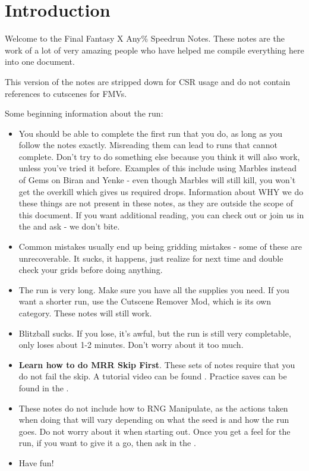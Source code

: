 \chapter{Introduction}

Welcome to the Final Fantasy X Any\% Speedrun Notes. These notes are the work of a lot of very amazing people who have helped me compile everything here into one document.

This version of the notes are stripped down for CSR usage and do not contain references to cutscenes for FMVs.

Some beginning information about the run:

\begin{itemize}
    \item You should be able to complete the first run that you do, as long as you follow the notes exactly. Misreading them can lead to runs that cannot complete. Don't try to do something else because you think it will also work, unless you've tried it before. Examples of this include using Marbles instead of Gems on Biran and Yenke - even though Marbles will still kill, you won't get the overkill which gives us required drops. Information about WHY we do these things are not present in these notes, as they are outside the scope of this document. If you want additional reading, you can check out  or join us in the  and ask - we don't bite.
    \item Common mistakes usually end up being gridding mistakes - some of these are unrecoverable. It sucks, it happens, just realize for next time and double check your grids before doing anything.
    \item The run is very long. Make sure you have all the supplies you need. If you want a shorter run, use the Cutscene Remover Mod, which is its own category. These notes will still work.
    \item Blitzball sucks. If you lose, it's awful, but the run is still very completable, only loses about 1-2 minutes. Don't worry about it too much.
    \item \textbf{Learn how to do MRR Skip First}. These sets of notes require that you do not fail the skip. A tutorial video can be found . Practice saves can be found in the .
    \item These notes do not include how to RNG Manipulate, as the actions taken when doing that will vary depending on what the seed is and how the run goes. Do not worry about it when starting out. Once you get a feel for the run, if you want to give it a go, then ask in the .
    \item Have fun!
\end{itemize}

